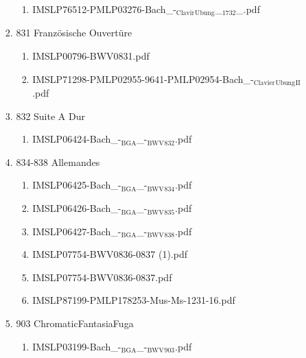 \documentclass[11pt]{article}
\begin{document}
\begin{enumerate}
\begin{enumerate}
\begin{enumerate}
\begin{enumerate}
\item IMSLP76512-PMLP03276-Bach\_-$_{\text{Clavir}}$$_{\text{Ubung}}$\_$_{\text{1732}}$\_.pdf
\label{sec-1-1-1-1-44-6-4-2-4-8}
\end{enumerate}

\item 831 Französische Ouvertüre
\label{sec-1-1-1-1-44-6-4-2-5}
\begin{enumerate}
\item IMSLP00796-BWV0831.pdf
\label{sec-1-1-1-1-44-6-4-2-5-1}

\item IMSLP71298-PMLP02955-9641-PMLP02954-Bach\_-$_{\text{Clavier}}$$_{\text{Ubung}}$$_{\text{II}}$.pdf
\label{sec-1-1-1-1-44-6-4-2-5-2}
\end{enumerate}

\item 832 Suite A Dur
\label{sec-1-1-1-1-44-6-4-2-6}
\begin{enumerate}
\item IMSLP06424-Bach\_-$_{\text{BGA}}$\_-$_{\text{BWV}}$$_{\text{832}}$.pdf
\label{sec-1-1-1-1-44-6-4-2-6-1}
\end{enumerate}

\item 834-838 Allemandes
\label{sec-1-1-1-1-44-6-4-2-7}
\begin{enumerate}
\item IMSLP06425-Bach\_-$_{\text{BGA}}$\_-$_{\text{BWV}}$$_{\text{834}}$.pdf
\label{sec-1-1-1-1-44-6-4-2-7-1}

\item IMSLP06426-Bach\_-$_{\text{BGA}}$\_-$_{\text{BWV}}$$_{\text{835}}$.pdf
\label{sec-1-1-1-1-44-6-4-2-7-2}

\item IMSLP06427-Bach\_-$_{\text{BGA}}$\_-$_{\text{BWV}}$$_{\text{838}}$.pdf
\label{sec-1-1-1-1-44-6-4-2-7-3}

\item IMSLP07754-BWV0836-0837 (1).pdf
\label{sec-1-1-1-1-44-6-4-2-7-4}

\item IMSLP07754-BWV0836-0837.pdf
\label{sec-1-1-1-1-44-6-4-2-7-5}

\item IMSLP87199-PMLP178253-Mus-Ms-1231-16.pdf
\label{sec-1-1-1-1-44-6-4-2-7-6}
\end{enumerate}

\item 903 ChromaticFantasiaFuga
\label{sec-1-1-1-1-44-6-4-2-8}
\begin{enumerate}
\item IMSLP03199-Bach\_-$_{\text{BGA}}$\_-$_{\text{BWV}}$$_{\text{903}}$.pdf
\label{sec-1-1-1-1-44-6-4-2-8-1}


\end{enumerate}
\end{enumerate}
\end{enumerate}
\end{enumerate}
\end{document}
